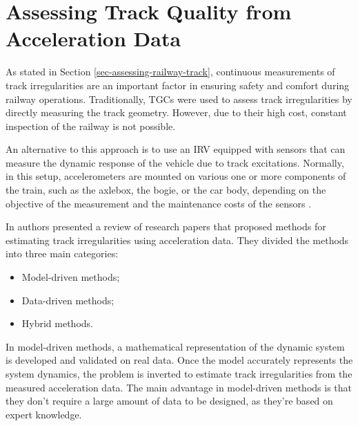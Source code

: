 \section{Assessing Track Quality from Acceleration Data} \label{sec-track-quality-accel}

As stated in Section \ref{sec-assessing-railway-track}, continuous measurements of track irregularities are an important factor in ensuring safety and comfort during railway operations. Traditionally, TGCs were used to assess track irregularities by directly measuring the track geometry. However, due to their high cost, constant inspection of the railway is not possible. 

An alternative to this approach is to use an IRV equipped with sensors that can measure the dynamic response of the vehicle due to track excitations. Normally, in this setup, accelerometers are mounted on various one or more components of the train, such as the axlebox, the bogie, or the car body, depending on the objective of the measurement and the maintenance costs of the sensors \cite{vibration7040049,Sansinena26032025}. 

In \cite{Sansinena26032025} authors presented a review of research papers that proposed methods for estimating track irregularities using acceleration data. They divided the methods into three main categories:
\begin{itemize}
    \item Model-driven methods;
    \item Data-driven methods;
    \item Hybrid methods.
\end{itemize}

In model-driven methods, a mathematical representation of the dynamic system is developed and validated on real data. Once the model accurately represents the system dynamics, the problem is inverted to estimate track irregularities from the measured acceleration data. The main advantage in model-driven methods is that they don't require a large amount of data to be designed, as they're based on expert knowledge. 

